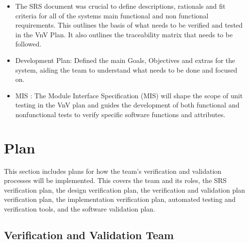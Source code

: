 \documentclass[12pt, titlepage]{article}
\begin{document}
  \begin{itemize}
    \item The SRS document was crucial to define descriptions, rationals and fit criteria for all of the systems main functional 
    and non functional requirements. This outlines the basis of what needs to be verified and tested in the VnV Plan. It also outlines the 
    traceability matrix that needs to be followed.
    \item Development Plan: Defined the main Goals, Objectives and extras for the system, aiding the team to understand what
     needs to be done and focused on. 
    \item MIS : The Module Interface Specification (MIS) will shape the scope of unit testing in the VnV plan and guides 
    the development of both functional and nonfunctional tests to verify specific software functions and attributes.
  \end{itemize}
  

\citet{SRS}


\newpage

\section{Plan}
\hspace{2em}This section includes plans for how the team's verification and validation processes will
be implemented. This covers the team and its roles, the SRS verification plan, the design
verification plan, the verification and validation plan verification plan, the implementation
verification plan, automated testing and verification tools, and the software validation plan.

\subsection{Verification and Validation Team}
\end{document}
